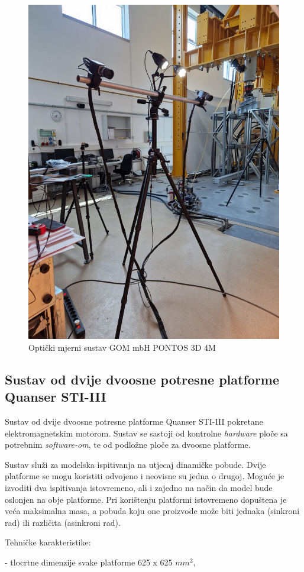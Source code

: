 \documentclass[12pt]{book}
\begin{document}
\begin{figure}[H]
	\centering
	\includegraphics[width=0.7\linewidth]{Slike/kamere}
	\caption{Optički mjerni sustav GOM mbH PONTOS 3D 4M}
	\label{fig:kamere}
\end{figure}

\newpage

\subsection{Sustav od dvije dvoosne potresne platforme Quanser STI-III}

Sustav od dvije dvoosne potresne platforme Quanser STI-III pokretane elektromagnetskim motorom. Sustav se sastoji od kontrolne \textit{hardware} ploče sa potrebnim \textit{software-om}, te od podložne ploče za dvoosne platforme.

Sustav služi za modelska ispitivanja na utjecaj dinamičke pobude. Dvije platforme se mogu koristiti odvojeno i neovisne su jedna o drugoj. Moguće je izvoditi dva ispitivanja istovremeno, ali i zajedno na način da model bude oslonjen na obje platforme. Pri korištenju platformi istovremeno dopuštena je veća maksimalna masa, a pobuda koju one proizvode može biti jednaka (sinkroni rad) ili različita (asinkroni rad). \cite{oprema}

Tehničke karakteristike:

- tlocrtne dimenzije svake platforme 625 x 625 $mm^2$,
\end{document}
